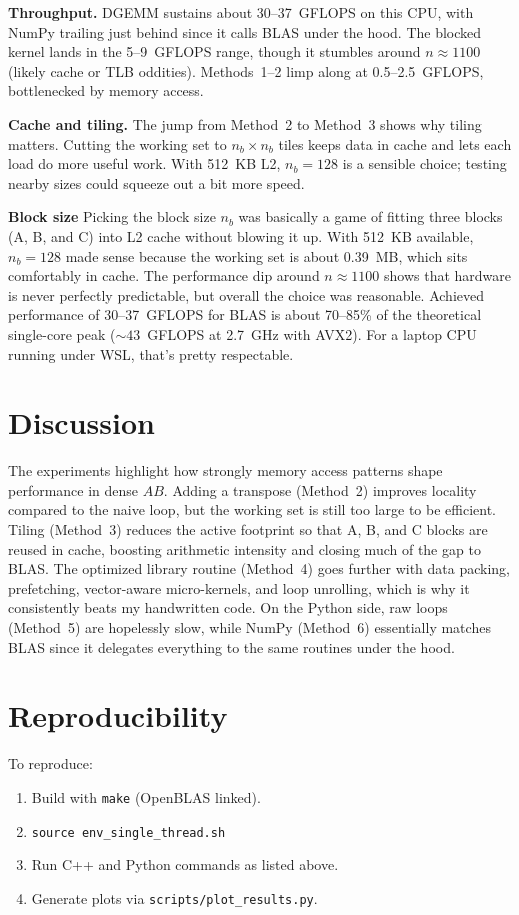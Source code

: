 \documentclass[11pt,a4paper]{article}
\begin{document}
	\textbf{Throughput.} DGEMM sustains about 30--37~GFLOPS on this CPU, with NumPy trailing just behind since it calls BLAS under the hood. The blocked kernel lands in the 5--9~GFLOPS range, though it stumbles around $n \approx 1100$ (likely cache or TLB oddities). Methods~1--2 limp along at 0.5--2.5~GFLOPS, bottlenecked by memory access.  
	
	\textbf{Cache and tiling.} The jump from Method~2 to Method~3 shows why tiling matters. Cutting the working set to $n_b \times n_b$ tiles keeps data in cache and lets each load do more useful work. With 512~KB L2, $n_b=128$ is a sensible choice; testing nearby sizes could squeeze out a bit more speed.  
	
	
	\textbf{Block size} Picking the block size $n_b$ was basically a game of fitting three blocks (A, B, and C) into L2 cache without blowing it up. With 512~KB available, $n_b=128$ made sense because the working set is about 0.39~MB, which sits comfortably in cache. The performance dip around $n \approx 1100$ shows that hardware is never perfectly predictable, but overall the choice was reasonable. Achieved performance of 30–37~GFLOPS for BLAS is about 70--85\% of the theoretical single-core peak ($\sim 43$~GFLOPS at 2.7~GHz with AVX2). For a laptop CPU running under WSL, that’s pretty respectable.
	
	\section{Discussion}
	The experiments highlight how strongly memory access patterns shape performance in dense $AB$. 
	Adding a transpose (Method~2) improves locality compared to the naive loop, but the working set is still too large to be efficient. 
	Tiling (Method~3) reduces the active footprint so that A, B, and C blocks are reused in cache, boosting arithmetic intensity and closing much of the gap to BLAS. 
	The optimized library routine (Method~4) goes further with data packing, prefetching, vector-aware micro-kernels, and loop unrolling, which is why it consistently beats my handwritten code. 
	On the Python side, raw loops (Method~5) are hopelessly slow, while NumPy (Method~6) essentially matches BLAS since it delegates everything to the same routines under the hood.  

	
	\section{Reproducibility}
	To reproduce:
	\begin{enumerate}
		\item Build with \verb|make| (OpenBLAS linked).
		\item \verb|source env_single_thread.sh|
		\item Run C++ and Python commands as listed above.
		\item Generate plots via \verb|scripts/plot_results.py|.
	\end{enumerate}
	
\end{document}
